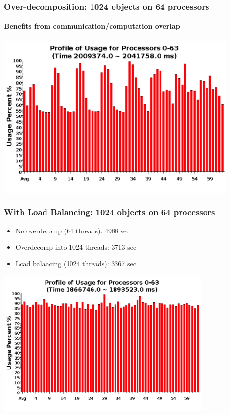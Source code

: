\begin{frame}[fragile]
\frametitle{Over-decomposition: 1024 objects on 64 processors}
\framesubtitle{Benefits from communication/computation overlap}
\begin{center}\includegraphics[width=0.9\textwidth]{../figures/usageVirtual.png}\end{center}
\end{frame}


\begin{frame}[fragile]
\frametitle{With Load Balancing: 1024 objects on 64 processors}
\begin{center}
\begin{itemize}
\item No overdecomp (64 threads): 4988 sec
\item Overdecomp into 1024 threads: 3713 sec
\item Load balancing (1024 threads): 3367 sec
\end{itemize}
\includegraphics[width=0.8\textwidth]{../figures/usageLB.png}
\end{center}
\end{frame}

